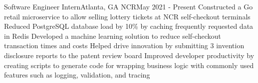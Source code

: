\resumeSubheading
{Software Engineer Intern}{Atlanta, GA}
{NCR}{May 2021 - Present}
\resumeItemListStart
\resumeItem
{Constructed a Go retail microservice to allow selling lottery tickets at NCR self-checkout terminals}
\resumeItem
{Reduced PostgreSQL database load by 10\% by caching frequently requested data in Redis}
\resumeItem
{Developed a machine learning solution to reduce self-checkout transaction times
  and costs}
\resumeItem
{Helped drive innovation by submitting 3 invention disclosure reports to the patent review board}
\resumeItem
{Improved developer productivity by creating scripts to generate code for wrapping business logic with
  commonly used features such as logging, validation, and tracing}
\resumeItemListEnd